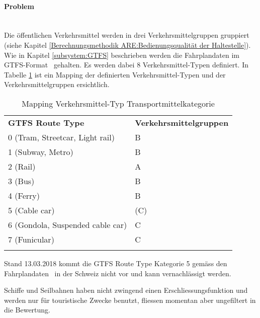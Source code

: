\paragraph{Problem}~\\
Die öffentlichen Verkehrsmittel werden in drei Verkehrsmittelgruppen gruppiert (siehe Kapitel \ref{Berechnungsmethodik ARE:Bedienungsqualität der Haltestelle}).
Wie in Kapitel \ref{subsystem:GTFS} beschrieben werden die Fahrplandaten im \acs{GTFS}-Format~\cite{gtfs_spec} gehalten. 
Es werden dabei 8 Verkehrsmittel-Typen definiert.
In Tabelle \ref{table:Mapping Verkehrsmittel-Typ Transportmittelkategorie} ist ein Mapping der definierten Verkehrsmittel-Typen und der Verkehrsmittelgruppen ersichtlich.

\begin{longtable}[ht]{l l}
        \midrule
        \textbf{GTFS Route Type} 
                                & \textbf{Verkehrsmittelgruppen}\\
        0 (Tram, Streetcar, Light rail)
                                & B\\
        1 (Subway, Metro)
                                & B\\
        2 (Rail)
                                & A\\
        3 (Bus)
                                & B\\
        4 (Ferry)
                                & B\\
        5 (Cable car)
                                & (C)\\
        6 (Gondola, Suspended cable car)
                                & C\\
        7 (Funicular)
                                & C\\            
        \bottomrule
    \caption{Mapping Verkehrsmittel-Typ Transportmittelkategorie}
    \label{table:Mapping Verkehrsmittel-Typ Transportmittelkategorie}
\end{longtable}

Stand 13.03.2018 kommt die GTFS Route Type Kategorie 5 gemäss den Fahrplandaten~\cite{geops_fahrplandaten} in der Schweiz nicht vor und kann vernachlässigt werden.

Schiffe und Seilbahnen haben nicht zwingend einen Erschliessungsfunktion und werden nur für touristische Zwecke benutzt, fliessen momentan aber ungefiltert in die Bewertung.


